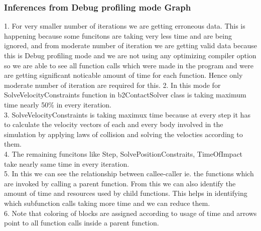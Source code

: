 \documentclass[11pt]{article}
\begin{document}
\subsubsection{Inferences from Debug profiling mode Graph}
1. For very smaller number of iterations we are getting erroneous data. This is happening because some funcitons are taking 		very less time and are being ignored, and from moderate number of iteration we are getting valid data because this is Debug 	profiling mode and we are not using any optimizing compiler option so we are able to see all function calls which were made 
	in the program and were are getting significant noticable amount of time for each function. Hence only moderate number of iteration are required for this.
2. In this mode for SolveVelocityConstraints function in b2ContactSolver class is taking maximum time nearly 	   50\% in every iteration. \\
3. SolveVelocityConstraints is taking maximux time because at every step it has to calculate the velocity vectors of each and 		every body involved in the simulation by applying laws of collision and solving the velocties according to them. \\
4. The remaining funcitons like Step, SolvePositionConstraits, TimeOfImpact take nearly same time in every iteration. \\
5. In this we can see the relationship between callee-caller ie. the functions which are invoked by calling a parent function.
   From this we can also identify the amount of time and resources used by child functions. This helps in identifying which subfunction calls taking more time and we can reduce them.\\
6. Note that coloring of blocks are assigned according to usage of time and arrows point to all function calls inside a parent
   function.
\end{document}
